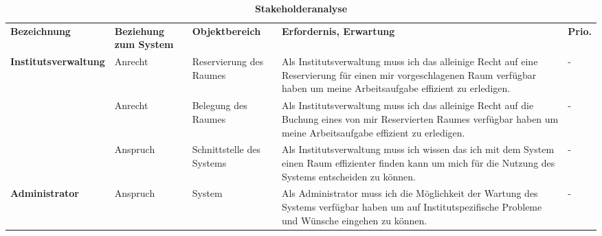 \begin{table}
	
 	\caption{\textbf{Stakeholderanalyse}}
 	\begin{tabularx}{\textwidth}{|X|X|X|X|m{}|}			
 		\rowcolor{heading}\textbf{Bezeichnung} & \textbf{Beziehung zum System} & \textbf{Objektbereich} & \textbf{Erfordernis, Erwartung} & \textbf{Prio.}\\
			 
 	\textbf{Institutsverwaltung} & Anrecht & Reservierung des Raumes & Als Institutsverwaltung muss ich das alleinige Recht auf eine Reservierung für einen mir vorgeschlagenen Raum verfügbar haben um meine Arbeitsaufgabe effizient zu erledigen. & -\\
\rowcolor{odd} & Anrecht & Belegung des Raumes & Als Institutsverwaltung muss ich das alleinige Recht auf die Buchung eines von mir Reservierten Raumes verfügbar haben um meine Arbeitsaufgabe effizient zu erledigen. & -\\
	& Anspruch & Schnittstelle des Systems & Als Institutsverwaltung muss ich wissen das ich mit dem System einen Raum effizienter finden kann um mich für die Nutzung des Systems entscheiden zu können. & -\\
\rowcolor{odd} \textbf{Administrator} & Anspruch & 	System & Als Administrator muss ich die Möglichkeit der Wartung des Systems verfügbar haben um auf Institutspezifische Probleme und Wünsche eingehen zu können. & -\\ \hline
 	\end{tabularx}
 	
\end{table}

